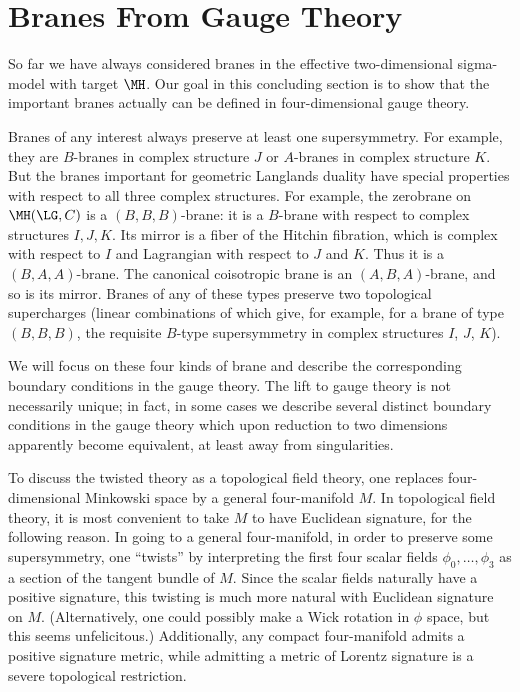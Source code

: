 
\section{Branes From Gauge Theory}
\label{sec:zapendix}

So far we have always considered branes in the effective
two-dimensional sigma-model with target $\MH$.  Our goal in this
concluding section is to show that the important branes actually
can be defined in four-dimensional gauge theory.

Branes of any interest always preserve at least one supersymmetry.
For example, they are $B$-branes in complex structure $J$ or
$A$-branes in complex structure $K$.  But the branes important for
geometric Langlands duality have special properties with respect
to all three complex structures. For example, the zerobrane on
$\MH(\LG,C)$ is a $(B,B,B)$-brane: it is a $B$-brane with respect
to complex structures $I,J,K$. Its mirror is a fiber of the
Hitchin fibration, which is complex with respect to $I$ and
Lagrangian with respect to $J$ and $K$. Thus it is a
$(B,A,A)$-brane. The canonical coisotropic brane is an
$(A,B,A)$-brane, and so is its mirror.  Branes of any of these
types preserve two topological supercharges (linear combinations
of which give, for example, for a brane of type $(B,B,B)$, the
requisite $B$-type supersymmetry in complex structures $I$, $J$,
$K$).

We will focus on these four kinds of brane and describe the
corresponding boundary conditions in the gauge theory.  The lift
to gauge theory is not necessarily unique; in fact, in some cases
we describe several distinct boundary conditions in the gauge
theory which upon reduction to two dimensions apparently become
equivalent, at least away from singularities.

To discuss the twisted theory as a topological field theory, one
replaces four-dimensional Minkowski space by a general
four-manifold $M$.  In topological field theory, it  is most
convenient to take $M$ to have Euclidean signature, for the
following reason. In going to a general four-manifold, in order to
preserve some supersymmetry, one ``twists'' by interpreting the
first four scalar fields $\phi_0,\dots,\phi_3$ as a section of the
tangent bundle of $M$. Since the scalar fields naturally have a
positive signature, this twisting is much more natural with
Euclidean signature on $M$. (Alternatively, one could possibly
make a Wick rotation in $\phi$ space, but this seems
unfelicitous.)  Additionally, any compact four-manifold admits a
positive signature metric, while admitting a metric of Lorentz
signature is a severe topological restriction.

